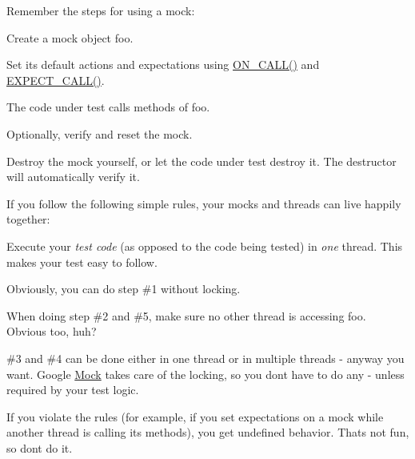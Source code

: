 Remember the steps for using a mock\+:


\begin{DoxyEnumerate}
\item Create a mock object {\ttfamily foo}.
\end{DoxyEnumerate}
\begin{DoxyEnumerate}
\item Set its default actions and expectations using {\ttfamily \mbox{\hyperlink{gmock-spec-builders_8h_a5b12ae6cf84f0a544ca811b380c37334}{O\+N\+\_\+\+C\+A\+L\+L()}}} and {\ttfamily \mbox{\hyperlink{gmock-spec-builders_8h_a535a6156de72c1a2e25a127e38ee5232}{E\+X\+P\+E\+C\+T\+\_\+\+C\+A\+L\+L()}}}.
\end{DoxyEnumerate}
\begin{DoxyEnumerate}
\item The code under test calls methods of {\ttfamily foo}.
\end{DoxyEnumerate}
\begin{DoxyEnumerate}
\item Optionally, verify and reset the mock.
\end{DoxyEnumerate}
\begin{DoxyEnumerate}
\item Destroy the mock yourself, or let the code under test destroy it. The destructor will automatically verify it.
\end{DoxyEnumerate}

If you follow the following simple rules, your mocks and threads can live happily together\+:


\begin{DoxyItemize}
\item Execute your {\itshape test code} (as opposed to the code being tested) in {\itshape one} thread. This makes your test easy to follow.
\item Obviously, you can do step \#1 without locking.
\item When doing step \#2 and \#5, make sure no other thread is accessing {\ttfamily foo}. Obvious too, huh?
\item \#3 and \#4 can be done either in one thread or in multiple threads -\/ anyway you want. Google \mbox{\hyperlink{classMock}{Mock}} takes care of the locking, so you don\textquotesingle{}t have to do any -\/ unless required by your test logic.
\end{DoxyItemize}

If you violate the rules (for example, if you set expectations on a mock while another thread is calling its methods), you get undefined behavior. That\textquotesingle{}s not fun, so don\textquotesingle{}t do it.

